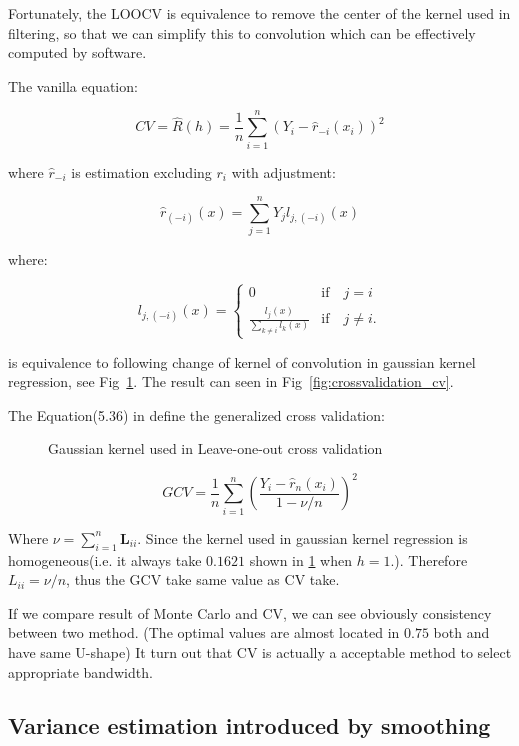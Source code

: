 \documentclass{article}
\begin{document}
Fortunately, the LOOCV is equivalence to remove the center of the kernel used in filtering, so that we can simplify this to 
convolution which can be effectively computed by software.

The vanilla equation:

$$
CV = \hat{R}(h)=\frac{1}{n}\sum_{i=1}^n (Y_i-\hat{r}_{-i}(x_i))^2
$$

where $\hat{r}_{-i}$ is estimation excluding $r_i$ with adjustment:

$$
\hat{r}_{(-i)}(x) = \sum_{j=1}^n Y_j l_{j,(-i)}(x)
$$

where:

$$
l_{j,(-i)}(x) = \begin{cases}
  0 & \text{if} \quad j=i \\
  \frac{l_j(x)}{\sum_{k \neq i} l_k(x)} & \text{if} \quad j \neq i.
\end{cases}
$$

is equivalence to following change of kernel of convolution in gaussian kernel regression, see Fig~\ref{fig:gaussian_kernel}. 
The result can seen in Fig~\ref{fig:crossvalidation_cv}.

The Equation(5.36) in \cite{wasserman2006all} define the generalized cross validation:

\begin{figure}[htb]
  \centering
  
  \caption{Gaussian kernel used in Leave-one-out cross validation}
  \label{fig:gaussian_kernel}
\end{figure}


$$
GCV = \frac{1}{n}\sum_{i=1}^n \left(\frac{Y_i-\hat{r}_n(x_i)}{1-\nu/n}\right)^2
$$

Where $\nu = \sum_{i=1}^n \mathbf{L}_{ii}$. 
Since the kernel used in gaussian kernel regression is homogeneous(i.e. it always take $0.1621$
shown in \ref{fig:gaussian_kernel} when $h=1$.). 
Therefore $L_{ii} = \nu/n$, thus the GCV take same value as CV take. 

If we compare result of Monte Carlo and CV, we can see obviously consistency between two method.
(The optimal values are almost located in $0.75$ both and have same U-shape)
It turn out that CV is actually a acceptable method to select appropriate bandwidth.

\subsection{Variance estimation introduced by smoothing}
\end{document}

